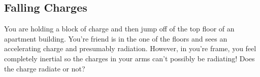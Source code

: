 \subsection{Falling Charges}
	You are holding a block of charge and then jump off of the top floor of an apartment building.
	You're friend is in the one of the floors and sees an accelerating charge and presumably radiation.
	However, in you're frame, you feel completely inertial so the charges in your arms can't possibly be
	radiating! Does the charge radiate or not?
